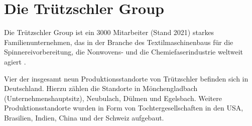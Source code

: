 \section{Die Trützschler Group}
    Die Trützschler Group ist ein 3000 Mitarbeiter (Stand 2021) starkes Familienunternehmen, das in der Branche des Textilmaschinenbaus für die Spinnereivorbereitung, die Nonwovens- und die Chemiefaserindustrie weltweit agiert \cite{noauthor_trutzschler_nodate-1}.
    
    Vier der insgesamt neun Produktionsstandorte von Trützschler befinden sich in Deutschland.
    Hierzu zählen die Standorte in Mönchengladbach (Unternehmenshauptsitz), Neubulach, Dülmen und Egelsbach.
    Weitere Produktionsstandorte wurden in Form von Tochtergesellschaften in den USA, Brasilien, Indien, China und der Schweiz aufgebaut. \cite{noauthor_familienunternehmen_nodate}